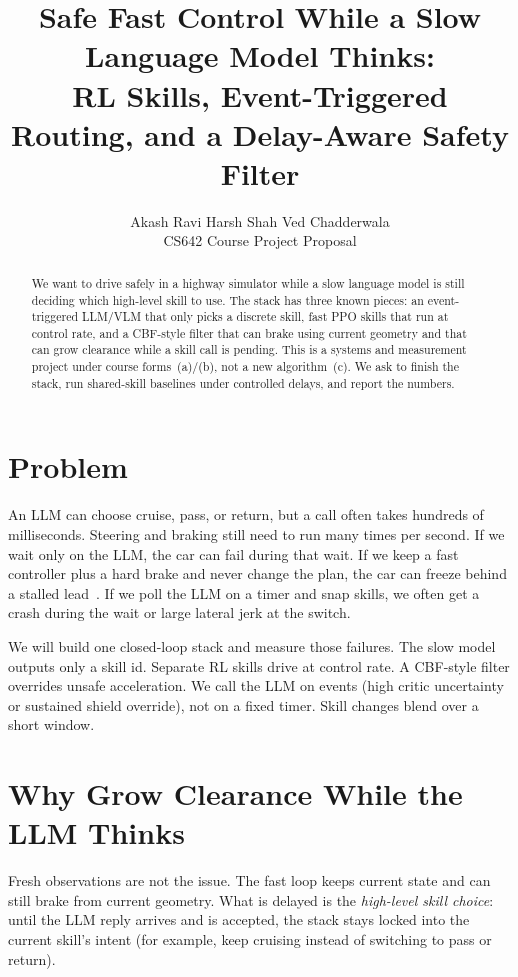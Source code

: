 \documentclass[11pt]{article}
\title{\vspace{-1.1em}Safe Fast Control While a Slow Language Model Thinks:\\
RL Skills, Event-Triggered Routing, and a Delay-Aware Safety Filter}
\author{Akash Ravi \quad Harsh Shah \quad Ved Chadderwala\\
\small CS642 Course Project Proposal}
\date{}
\begin{document}
\maketitle
\vspace{-1.6em}

\begin{abstract}
\noindent
We want to drive safely in a highway simulator while a slow language model is still deciding which high-level skill to use. The stack has three known pieces: an event-triggered LLM/VLM that only picks a discrete skill, fast PPO skills that run at control rate, and a CBF-style filter that can brake using current geometry and that can grow clearance while a skill call is pending. This is a systems and measurement project under course forms~(a)/(b), not a new algorithm~(c). We ask to finish the stack, run shared-skill baselines under controlled delays, and report the numbers.
\end{abstract}

\section{Problem}
An LLM can choose cruise, pass, or return, but a call often takes hundreds of milliseconds. Steering and braking still need to run many times per second. If we wait only on the LLM, the car can fail during that wait. If we keep a fast controller plus a hard brake and never change the plan, the car can freeze behind a stalled lead~\citep{trautman2010freezing}. If we poll the LLM on a timer and snap skills, we often get a crash during the wait or large lateral jerk at the switch.

We will build one closed-loop stack and measure those failures. The slow model outputs only a skill id. Separate RL skills drive at control rate. A CBF-style filter overrides unsafe acceleration. We call the LLM on events (high critic uncertainty or sustained shield override), not on a fixed timer. Skill changes blend over a short window.

\section{Why Grow Clearance While the LLM Thinks}
Fresh observations are not the issue. The fast loop keeps current state and can still brake from current geometry. What is delayed is the \emph{high-level skill choice}: until the LLM reply arrives and is accepted, the stack stays locked into the current skill's intent (for example, keep cruising instead of switching to pass or return).
\end{document}
